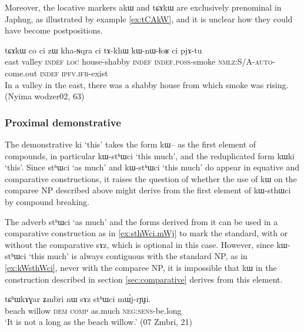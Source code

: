 \documentclass[oldfontcommands,oneside,a4paper,11pt]{article}
\newcommand{\ipa}[1]{{\phon #1}} %
\begin{document}
Moreover, the  locative markers \ipa{akɯ} and  \ipa{tɕɤkɯ} are exclusively prenominal in Japhug, as illustrated by example \ref{ex:tCAkW}, and it is unclear how they could have become postpositions.


\begin{exe}
\ex \label{ex:tCAkW}
\gll 
\ipa{tɕɤkɯ}  	\ipa{co}  	\ipa{ci}  	\ipa{zɯ}  	\ipa{kha-ɴqra}  	\ipa{ci}  	\ipa{tɤ-khɯ}  	\ipa{kɯ-nɯ-ɬoʁ}  	\ipa{ci}  	\ipa{pjɤ-tu}  \\
east valley \textsc{indef} \textsc{loc} house-shabby \textsc{indef} \textsc{indef.poss}-smoke \textsc{nmlz:S/A-auto}-come.out  \textsc{indef}  \textsc{ipfv.ifr}-exist \\
\glt In a valley in the east, there was a shabby house from which smoke was rising.  (Nyima wodzer02, 63)
\end{exe}

\subsubsection{Proximal demonstrative}
The demonstrative \ipa{ki} `this' takes the form \ipa{kɯ--} as the first element of compounds, in particular \ipa{kɯ-stʰɯci} `this much',  and the reduplicated form \ipa{kɯki} `this'.  Since \ipa{stʰɯci} `as much' and \ipa{kɯ-stʰɯci} `this much' do appear in equative and comparative constructions, it raises the question of whether the use of \ipa{kɯ} on the comparee NP described above might derive from the first element of \ipa{kɯ-sthɯci} by compound breaking.

The adverb \ipa{stʰɯci} `as much' and the forms derived from it can be used in a comparative construction as in \ref{ex:sthWci.mWj} to mark the standard, with or without the comparative \ipa{sɤz}, which is optional in this case. However, since  \ipa{kɯ-stʰɯci} `this much' is always contiguous with the standard NP, as in \ref{ex:kWsthWci}, never with the comparee NP, it is impossible that \ipa{kɯ} in the construction described in section \ref{sec:comparative} derives from this element.
 
 
  \begin{exe}
\ex \label{ex:sthWci.mWj}
\gll 
 \ipa{tɕʰɯkɤɣar}  	\ipa{ʑmbri}  	\ipa{nɯ}  	\ipa{sɤz}  	\ipa{stʰɯci}  	\ipa{mɯ́j-rɲɟi.}  \\
beach willow \textsc{dem} \textsc{comp} as.much \textsc{neg:sens}-be.long \\
\glt `It is not a long as the beach willow.' (07 Zmbri, 21)
  \end{exe}
\end{document}
